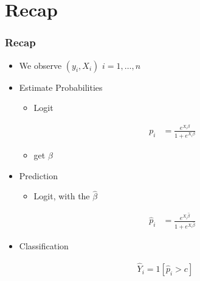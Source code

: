 \documentclass[
  shownotes,
  xcolor={svgnames},
  hyperref={colorlinks,citecolor=DarkBlue,linkcolor=andesred,urlcolor=DarkBlue}
  , aspectratio=169]{beamer}
\begin{document}
\section{Recap}
\begin{frame}[fragile]
\frametitle{Recap}

\begin{itemize}
  \item We observe $(y_i,X_i)$ $i=1,\dots,n$
  \medskip
  \item Estimate Probabilities
  \begin{itemize}
  \item Logit

    \begin{align}
    p_i &=\frac{e^{X_i\beta}}{1+e^{X_i\beta}}
    \end{align}
    \item get $\beta$
  \end{itemize}


\item Prediction
 \begin{itemize}
  \item Logit, with the $\hat{\beta}$

    \begin{align}
\hat{p}_i &=\frac{e^{X_i\hat{\beta}}}{1+e^{X_i\hat{\beta}}}
\end{align}  
      
  \end{itemize}


\item Classification 

\begin{align}
\hat{Y}_i= 1[\hat{p}_i >c]
\end{align}
\end{itemize}
\end{frame}
\end{document}
